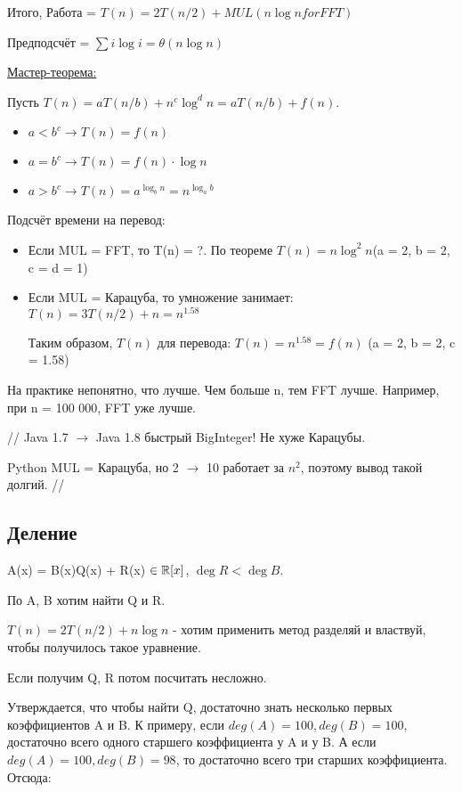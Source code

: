 \begin{enumerate}
Итого, Работа = $T(n) = 2T(n/2) + MUL(n \log n for FFT)$

Предподсчёт = $\sum i \log i = \theta(n \log n)$

\underline{Мастер-теорема:}

Пусть $T(n) = aT(n/b) + n^c\log^d n = aT(n/b) + f(n)$.
\begin{itemize}
    \item $a < b^c \rightarrow T(n) = f(n)$
    \item $a = b^c \rightarrow T(n) = f(n)\cdot\log n$
    \item $a > b^c \rightarrow T(n) = a^{\log_b n} = n^{\log_a b}$
\end{itemize}

Подсчёт времени на перевод:
\begin{itemize}
    \item Если MUL = FFT, то T(n) = ?. По теореме $T(n) = n\log^2 n$(a = 2, b = 2, c = d = 1)
    \item Если MUL = Карацуба, то умножение занимает: $T(n) = 3T(n/2) + n = n^{1.58}$
    
    Таким образом, $T(n)$ для перевода: $T(n) = n^{1.58} = f(n)$ (a = 2, b = 2, c = 1.58)   
\end{itemize}

На практике непонятно, что лучше. Чем больше n, тем FFT лучше. Например, при n = 100 000, FFT уже лучше.

// Java 1.7 $\rightarrow$ Java 1.8 быстрый BigInteger! Не хуже Карацубы.

Python MUL = Карацуба, но 2 $\rightarrow$ 10 работает за $n^2$, поэтому вывод такой долгий. //

\subsection{Деление}

A(x) = B(x)Q(x) + R(x) $\in \mathbb{R}[x]$, $\deg R < \deg B$.

По A, B хотим найти Q и R.

$T(n) = 2T(n/2) + n \log n$ - хотим применить метод разделяй и властвуй, чтобы получилось такое уравнение.

Если получим Q, R потом посчитать несложно.

Утверждается, что чтобы найти Q, достаточно знать несколько первых коэффициентов A и B. К примеру, если $deg(A) = 100, deg(B) = 100$, достаточно всего одного старшего коэффициента у A и у B. А если $deg(A) = 100, deg(B) = 98$, то достаточно всего три старших коэффициента. Отсюда:


\end{enumerate}
